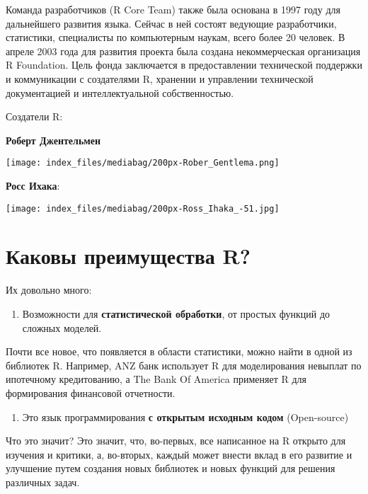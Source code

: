 \documentclass[
  letterpaper,
  DIV=11,
  numbers=noendperiod]{scrreprt}
\providecommand{\tightlist}{%
  \setlength{\itemsep}{0pt}\setlength{\parskip}{0pt}}\usepackage{longtable,booktabs,array}
\begin{document}
Команда разработчиков (R Core Team) также была основана в 1997 году для
дальнейшего развития языка. Сейчас в ней состоят ведующие разработчики,
статистики, специалисты по компьютерным наукам, всего более 20 человек.
В апреле 2003 года для развития проекта была создана некоммерческая
организация R Foundation. Цель фонда заключается в предоставлении
технической поддержки и коммуникации с создателями R, хранении и
управлении технической документацией и интеллектуальной собственностью.

Создатели R:

\textbf{Роберт Джентельмен}

\texttt{[image: index\_files/mediabag/200px-Rober\_Gentlema.png]}

\textbf{Росс Ихака}:

\texttt{[image: index\_files/mediabag/200px-Ross\_Ihaka\_-51.jpg]}

\hypertarget{ux43aux430ux43aux43eux432ux44b-ux43fux440ux435ux438ux43cux443ux449ux435ux441ux442ux432ux430-r}{%
\section{Каковы преимущества
R?}\label{ux43aux430ux43aux43eux432ux44b-ux43fux440ux435ux438ux43cux443ux449ux435ux441ux442ux432ux430-r}}

Их довольно много:

\begin{enumerate}
\def\labelenumi{\arabic{enumi}.}
\tightlist
\item
  Возможности для \textbf{статистической обработки}, от простых функций
  до сложных моделей.
\end{enumerate}

Почти все новое, что появляется в области статистики, можно найти в
одной из библиотек R. Например, ANZ банк использует R для моделирования
невыплат по ипотечному кредитованию, а The Bank Of America применяет R
для формирования финансовой отчетности.

\begin{enumerate}
\def\labelenumi{\arabic{enumi}.}
\setcounter{enumi}{1}
\tightlist
\item
  Это язык программирования \textbf{с открытым исходным кодом}
  (Open-source)
\end{enumerate}

Что это значит? Это значит, что, во-первых, все написанное на R открыто
для изучения и критики, а, во-вторых, каждый может внести вклад в его
развитие и улучшение путем создания новых библиотек и новых функций для
решения различных задач.
\end{document}
